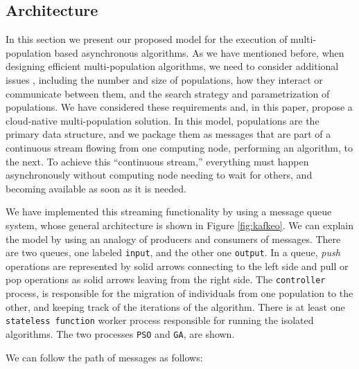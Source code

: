 \subsection{Architecture}
\label{arch}

In this section we present our proposed model for the execution of
multi-population based asynchronous algorithms. As we have mentioned before, when
designing efficient multi-population algorithms, we need to consider additional
issues \cite{Ma2019}, including the number and size of populations, how they
interact or communicate between them, and the search strategy and parametrization of
populations. We have considered these requirements and, in this paper,
propose a cloud-native
multi-population solution. In this model, populations are the primary data
structure, and we package them as messages that are part of a continuous stream flowing
from one computing node, performing an algorithm, to the next. To achieve this ``continuous stream,''
everything must happen asynchronously without computing node needing to wait for
others, and becoming available as soon as it is needed.

We have implemented this streaming functionality by using a message queue
system, whose general architecture is shown in Figure \ref{fig:kafkeo}. We can explain
the model by using an analogy of producers and consumers of messages. There are
two queues, one labeled \texttt{input}, and the other one \texttt{output}. In a
queue, {\em push} operations are represented by solid arrows connecting to the
left side and pull or pop operations as solid arrows leaving from the right
side. The \texttt{controller} process, is responsible for the migration of
individuals from one population to the other, and keeping track of the
iterations of the algorithm. There is at least one \texttt{stateless function}
worker process responsible for running the isolated algorithms. The two
processes \texttt{PSO} and \texttt{GA}, are shown.

We can follow the path of messages as follows:

